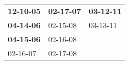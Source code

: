 \begin{supertabular}{p{0.33\columnwidth}p{0.33\columnwidth}p{0.33\columnwidth}}
 \textbf{12-10-05\textsuperscript{}} &  \textbf{02-17-07\textsuperscript{}} &  \textbf{03-12-11\textsuperscript{}} \\
 \textbf{04-14-06\textsuperscript{}} &           02-15-08\textsuperscript{} &           03-13-11\textsuperscript{} \\
 \textbf{04-15-06\textsuperscript{}} &           02-16-08\textsuperscript{} &                                      \\
          02-16-07\textsuperscript{} &           02-17-08\textsuperscript{} &                                      \\
\end{supertabular}
